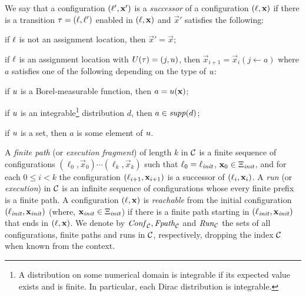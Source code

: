 \smallskip{}
We say that a configuration $(\ell',\mathbf{x}')$ is a \emph{successor} of a 
configuration $(\ell,\mathbf{x})$ if 
there is a transition  $\tau=(\ell,\ell')$ enabled in
$(\ell,\mathbf{x})$ 
and $\vec{x}'$ satisfies the following:
\begin{compactitem}
\item if $\ell$ is not an assignment location, then $\vec{x}'=\vec{x}$;
\item if $\ell$ is an assignment location with $U(\tau)=(j,u)$, then 
$\vec{x}_{i+1}=\vec{x}_i(j\leftarrow a)$ where $a$ satisfies one of the 
following 
depending on the type of $u$:
\begin{compactitem}
\item if $u$ is a Borel-measurable function, then $a=u(\mathbf{x})$;
\item if $u$ is an integrable\footnote{A distribution on some numerical 
domain 
is integrable if its expected value exists and is finite. In particular, each 
Dirac distribution is integrable.} distribution $d$, then 
$a\in \mathit{supp}(d)$;
\item if $u$ is a set, then $a$ is some element of $u$.
\end{compactitem}
\end{compactitem}
A \emph{finite path} (or
\emph{execution fragment}) of length $k$ in $\mathcal{C}$ is a finite sequence of
configurations $(\ell_0,\vec{x}_0)\cdots(\ell_k,\vec{x}_k)$ such that 
$\ell_0=\ell_{\mathit{init}}$, $\mathbf{x}_0\in\Xi_{\mathit{init}}$, and 
for each
$0 \leq i < k$ the configuration $(\ell_{i+1},\mathbf{x}_{i+1})$ is a successor of 
$(\ell_i,\mathbf{x}_i)$.
A \emph{run} (or \emph{execution}) in
$\mathcal{C}$ is an infinite sequence of configurations whose every finite
prefix is a finite path.
A configuration $(\ell,\mathbf{x})$ is {\em reachable} from the initial 
configuration
$(\ell_{\mathit{init}},\mathbf{x}_{\mathit{init}})$ (where, $\mathbf{x}_{\mathit{init}}\in \Xi_{\mathit{init}}$)
if there is a finite path starting in $(\ell_{\mathit{init}},\mathbf{x}_{\mathit{init}})$ that ends in
$(\ell,\mathbf{x})$. We denote by $\mathit{Conf}_{\mathcal{C}},\mathit{Fpath}_{\mathcal{C}}$ and $\mathit{Run}_{\mathcal{C}}$ the 
sets of all configurations, finite paths and runs in $\mathcal{C}$, respectively, 
dropping the index $\mathcal{C}$ when known from the context.


